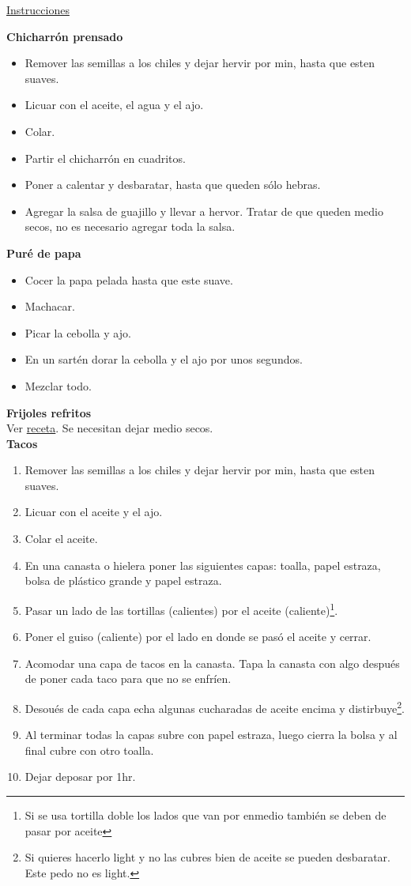 \underline{Instrucciones}

\textbf{Chicharrón prensado}
\begin{itemize}
\item Remover las semillas a los chiles y dejar hervir por  min, hasta que esten suaves.
\item Licuar con el aceite, el agua y el ajo.
\item Colar.
\item Partir el chicharrón en cuadritos.
\item Poner a calentar y desbaratar, hasta que queden sólo hebras. 
\item Agregar la salsa de guajillo y llevar a hervor. Tratar de que queden medio secos, no es necesario agregar toda la salsa.
\end{itemize}

\textbf{Puré de papa}
\begin{itemize}
\item Cocer la papa pelada hasta que este suave.
\item Machacar.
\item Picar la cebolla y ajo.
\item En un sartén dorar la cebolla y el ajo por unos segundos. 
\item Mezclar todo.
\end{itemize}

\textbf{Frijoles refritos}\\
Ver \href{sec:frijoles-refritos}{receta}. Se necesitan dejar medio secos.\\

\textbf{Tacos}
\begin{enumerate}
\item Remover las semillas a los chiles y dejar hervir por  min, hasta que esten suaves.
\item Licuar con el aceite y el ajo.
\item Colar el aceite.
\item En una canasta o hielera poner las siguientes capas: toalla, papel estraza, bolsa de plástico grande y papel estraza.
\item Pasar un lado de las tortillas (calientes) por el aceite (caliente)\footnote{Si se usa tortilla doble los lados que van por enmedio también se deben de pasar por aceite}.
\item Poner el guiso (caliente) por el lado en donde se pasó el aceite y cerrar.
\item Acomodar una capa de tacos en la canasta. Tapa la canasta con algo después de poner cada taco para que no se enfríen.
\item Desoués de cada capa echa algunas cucharadas de aceite encima y distirbuye\footnote{Si quieres hacerlo light y no las cubres bien de aceite se pueden desbaratar. Este pedo no es light.}.
\item Al terminar todas la capas subre con papel estraza, luego cierra la bolsa y al final cubre con otro toalla.
\item Dejar deposar por 1hr.
\end{enumerate}

